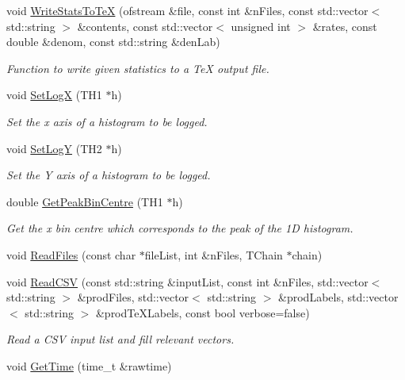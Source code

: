 \begin{DoxyCompactItemize}
void \hyperlink{namespacecalib_ac6a3669ab9c1554f92f4b1735bd02cd2}{Write\-Stats\-To\-Te\-X} (ofstream \&file, const int \&n\-Files, const std\-::vector$<$ std\-::string $>$ \&contents, const std\-::vector$<$ unsigned int $>$ \&rates, const double \&denom, const std\-::string \&den\-Lab)
\begin{DoxyCompactList}\small\item\em Function to write given statistics to a Te\-X output file. \end{DoxyCompactList}\item 
void \hyperlink{namespacecalib_ac9f07c3037f98888a6042f4aaec39038}{Set\-Log\-X} (T\-H1 $\ast$h)
\begin{DoxyCompactList}\small\item\em Set the x axis of a histogram to be logged. \end{DoxyCompactList}\item 
void \hyperlink{namespacecalib_ae369ae0c95b3326a3dea5f812058bebe}{Set\-Log\-Y} (T\-H2 $\ast$h)
\begin{DoxyCompactList}\small\item\em Set the Y axis of a histogram to be logged. \end{DoxyCompactList}\item 
double \hyperlink{namespacecalib_a60a5ea8e534e449cc2daa4dce2b570cb}{Get\-Peak\-Bin\-Centre} (T\-H1 $\ast$h)
\begin{DoxyCompactList}\small\item\em Get the x bin centre which corresponds to the peak of the 1\-D histogram. \end{DoxyCompactList}\item 
void \hyperlink{namespacecalib_aafd5f5728779f4c79d95f34203b6218f}{Read\-Files} (const char $\ast$file\-List, int \&n\-Files, T\-Chain $\ast$chain)
\item 
void \hyperlink{namespacecalib_a9223ec4660abfa7c4c749e3ef4954e03}{Read\-C\-S\-V} (const std\-::string \&input\-List, const int \&n\-Files, std\-::vector$<$ std\-::string $>$ \&prod\-Files, std\-::vector$<$ std\-::string $>$ \&prod\-Labels, std\-::vector$<$ std\-::string $>$ \&prod\-Te\-X\-Labels, const bool verbose=false)
\begin{DoxyCompactList}\small\item\em Read a C\-S\-V input list and fill relevant vectors. \end{DoxyCompactList}\item 
void \hyperlink{namespacecalib_a561fb5ee74ec984c53d40ad60837c28f}{Get\-Time} (time\-\_\-t \&rawtime)

\end{DoxyCompactItemize}
